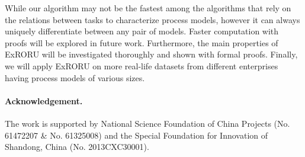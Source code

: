 \documentclass{llncs}
\begin{document}
While our algorithm may not be the fastest among the algorithms that rely on the relations between tasks to characterize process models, however it can always uniquely differentiate between any pair of models. Faster computation with proofs will be explored in future work. Furthermore, the main properties of ExRORU will be investigated thoroughly and shown with formal proofs. Finally, we will apply ExRORU on more real-life datasets from different enterprises having process models of various sizes.

\paragraph{\textbf{Acknowledgement.}} The work is supported by National Science Foundation of China Projects (No. 61472207 \& No. 61325008) and the Special Foundation for Innovation of Shandong, China (No. 2013CXC30001).



\end{document}
